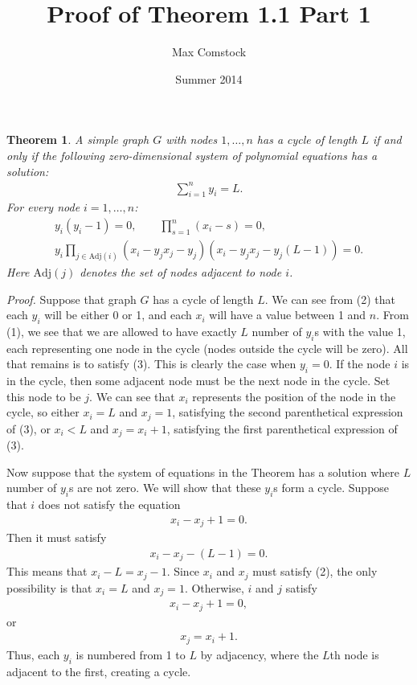\documentclass[letterpaper]{article}
\title{Proof of Theorem 1.1 Part 1}
\author{Max Comstock}
\date{Summer 2014}
\newtheorem*{theorem}{Theorem}
\newcommand{\aln}[1]{\begin{align*} #1 \end{align*}} %
\begin{document}
\maketitle

\begin{theorem}
A simple graph $G$ with nodes $1, \ldots, n$ has a cycle of length $L$ if and only if the following zero-dimensional system of polynomial equations has a solution:
\begin{gather}
	\sum_{i=1}^n y_i = L.
\end{gather}
For every node $i = 1, \ldots, n$:
\begin{gather}
	y_i (y_i - 1) = 0, \qquad \prod_{s=1}^n (x_i - s) = 0,\\
	y_i \prod_{j \in \mathrm{Adj}(i)} (x_i - y_j x_j - y_j) (x_i - y_j x_j - y_j(L-1)) = 0.
\end{gather}
Here $\mathrm{Adj}(j)$ denotes the set of nodes adjacent to node $i$.
\end{theorem}

\emph{Proof.} Suppose that graph $G$ has a cycle of length $L$. We can see from (2) that each $y_i$ will be either 0 or 1, and each $x_i$ will have a value between 1 and $n$. From (1), we see that we are allowed to have exactly $L$ number of $y_i$s with the value 1, each representing one node in the cycle (nodes outside the cycle will be zero). All that remains is to satisfy (3). This is clearly the case when $y_i = 0$. If the node $i$ is in the cycle, then some adjacent node must be the next node in the cycle. Set this node to be $j$. We can see that $x_i$ represents the position of the node in the cycle, so either $x_i = L$ and $x_j = 1$, satisfying the second parenthetical expression of (3), or $x_i < L$ and $x_j = x_i+1$, satisfying the first parenthetical expression of (3).

Now suppose that the system of equations in the Theorem has a solution where $L$ number of $y_i$s are not zero. We will show that these $y_i$s form a cycle. Suppose that $i$ does not satisfy the equation
\aln{
	x_i - x_j + 1 = 0.
}
Then it must satisfy
\aln{
	x_i - x_j - (L-1) = 0.
}
This means that $x_i - L = x_j - 1$. Since $x_i$ and $x_j$ must satisfy (2), the only possibility is that $x_i = L$ and $x_j = 1$. Otherwise, $i$ and $j$ satisfy
\aln{
	x_i - x_j + 1 = 0,
}
or
\aln{
	x_j = x_i + 1.
}
Thus, each $y_i$ is numbered from 1 to $L$ by adjacency, where the $L$th node is adjacent to the first, creating a cycle.
\end{document}
